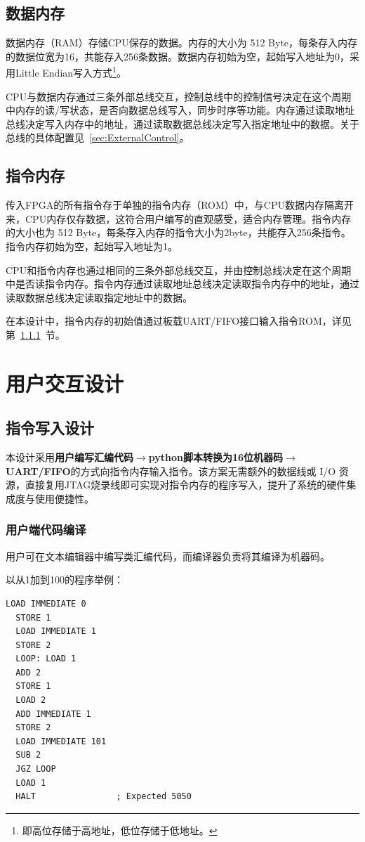 \documentclass[lang=cn,a4paper,newtx]{elegantpaper}
\begin{document}
\subsection{数据内存}
数据内存（RAM）存储CPU保存的数据。内存的大小为 512 Byte，每条存入内存的数据位宽为16，共能存入256条数据。数据内存初始为空，起始写入地址为0，采用Little Endian写入方式\footnote{即高位存储于高地址，低位存储于低地址。}。

CPU与数据内存通过三条外部总线交互，控制总线中的控制信号决定在这个周期中内存的读/写状态，是否向数据总线写入，同步时序等功能。内存通过读取地址总线决定写入内存中的地址，通过读取数据总线决定写入指定地址中的数据。关于总线的具体配置见~\ref{sec:ExternalControl}。

\subsection{指令内存}
传入FPGA的所有指令存于单独的指令内存（ROM）中，与CPU数据内存隔离开来，CPU内存仅存数据，这符合用户编写的直观感受，适合内存管理。指令内存的大小也为 512 Byte，每条存入内存的指令大小为2byte，共能存入256条指令。指令内存初始为空，起始写入地址为1。

CPU和指令内存也通过相同的三条外部总线交互，并由控制总线决定在这个周期中是否读指令内存。指令内存通过读取地址总线决定读取指令内存中的地址，通过读取数据总线决定读取指定地址中的数据。

在本设计中，指令内存的初始值通过板载UART/FIFO接口输入指令ROM，详见第~\ref{sec:UserCode}~节。

\section{用户交互设计}
\subsection{指令写入设计}
本设计采用\textbf{用户编写汇编代码}$\to$\textbf{python脚本转换为16位机器码}$\to$\textbf{UART/FIFO}的方式向指令内存输入指令。该方案无需额外的数据线或 I/O 资源，直接复用JTAG烧录线即可实现对指令内存的程序写入，提升了系统的硬件集成度与使用便捷性。

\subsubsection{用户端代码编译}\label{sec:UserCode}
用户可在文本编辑器中编写类汇编代码，而编译器负责将其编译为机器码。

以从1加到100的程序举例：
\begin{lstlisting}[language=Assembly]
  LOAD IMMEDIATE 0
  STORE 1
  LOAD IMMEDIATE 1
  STORE 2
  LOOP: LOAD 1
  ADD 2
  STORE 1
  LOAD 2
  ADD IMMEDIATE 1
  STORE 2
  LOAD IMMEDIATE 101
  SUB 2
  JGZ LOOP
  LOAD 1
  HALT                ; Expected 5050
\end{lstlisting}
\end{document}
